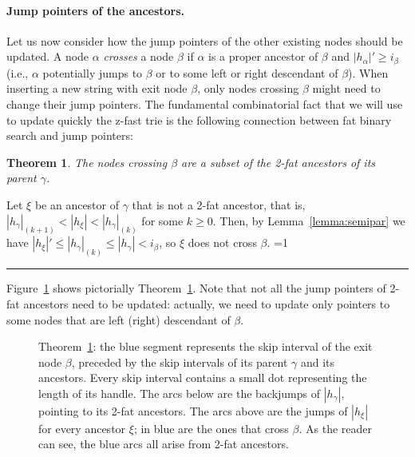 \documentclass[a4paper]{article}
\newcounter{noqed}
\newcommand{\qed}{ \ifmmode\mbox{
}\fi\rule[-.05em]{.3em}{.7em}\setcounter{noqed}{0}}
\newenvironment{proof}[1][{}]{\noindent{\bf Proof#1.
}\setcounter{noqed}{1}}{\ifnum\value{noqed}=1\qed\fi\par\medskip}
\newtheorem{theorem}{Theorem}
\newcommand{\?}{\mskip1.5mu}
\begin{document}
\paragraph{Jump pointers of the ancestors.}
Let us now consider how the jump pointers of the other existing nodes should be updated.
A node $\alpha$ \emph{crosses} a node
$\beta$ if $\alpha$ is a proper ancestor of $\beta$ 
and $|h_\alpha|'\geq i_\beta$ (i.e., $\alpha$
potentially jumps to $\beta$ or to some left or right descendant of $\beta$). When inserting a
new string with exit node $\beta$, only nodes crossing $\beta$ might need to change their
jump pointers. The fundamental combinatorial fact that we will use to update
quickly the z-fast trie is the following connection between fat binary search
and jump pointers:
\begin{theorem}
\label{th:fatanc}
The nodes crossing $\beta$ are a subset of the 2-fat ancestors of its parent
$\gamma$.
\end{theorem}
\begin{proof}
Let $\xi$ be an ancestor of  $\gamma$ that is not a 2-fat ancestor, that is,
$|h_\gamma|_{(k+1)}<|h_\xi|<|h_\gamma|_{(k)}$ for some $k\geq 0$. Then, by Lemma~\ref{lemma:semipar}
we have $|h_\xi|'\leq|h_\gamma|_{(k)}\leq |h_\gamma|<i_\beta$, so $\xi$ does not cross $\beta$.
 \end{proof}

Figure~\ref{fig:jumpline} shows pictorially Theorem~\ref{th:fatanc}. Note that not all the jump pointers of 2-fat ancestors need to be updated: actually, we
need to update only pointers to some nodes that are left (right) descendant of
$\beta$. 

 \begin{figure}[htbp]
 \centering
 
 \caption{\label{fig:jumpline}Theorem~\ref{th:fatanc}: the blue segment represents the skip interval of the exit node $\beta$, preceded by the
 skip intervals of its parent $\gamma$ and its ancestors. Every skip interval contains a small dot representing the length of its handle. The arcs
 below are the backjumps of $|h_\gamma|$, pointing to its 2-fat ancestors. The arcs above are the jumps of $|h_\xi|$ for every ancestor $\xi$; in blue are
 the ones that cross $\beta$. As the reader can see, the blue arcs all arise from 2-fat ancestors.}
 \end{figure}
 
\end{document}
